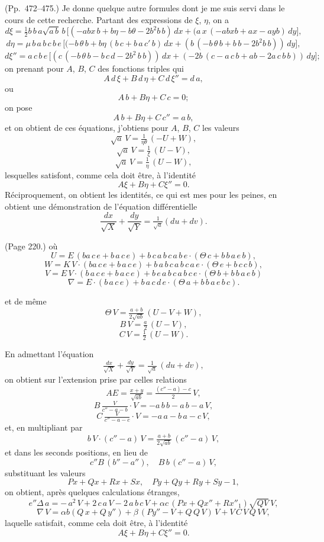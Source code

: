 \documentclass[11pt,a4paper]{article}
\theoremstyle{plain}
\theoremstyle{definition}
\begin{document}
\noindent (Pp.~472--475.) Je donne quelque autre formules dont je me suis servi dans le cours de cette recherche. Partant des expressions de $\xi$, $\eta$, on a
\[
d\xi = \tfrac{1}{2}b\,b\,a\sqrt{a\,b}\,b\,\big[(- a b x\,b + b\eta - b\theta - 2 b^2 b\,b)\,d x
+ (a\,x\,(- a b x b + ax - ay b)\,d y\big],
\]
\[
d\eta = \mu\,b\,a\,b\,c\,b\,e\,\big[(- b\,\theta\,b + b\eta\,(b\,c + b\,a\,c'\,b)\,d x
+ (b\,(- b\,\theta\,b + b\,b - 2 b^2 b\,b))\,d y\big],
\]
\[
d\xi'' = a\,c\,b\,e\,\big[(c\,(- b\,\theta\,b - b\,c\,d - 2 b^2\,b\,b))\,d x + (- 2 b\,(c - a\,c\,b + a b - 2 a\,c\,b\,b))\,d y\big];
\]
on prenant pour $A$, $B$, $C$ des fonctions triples qui
\[
A\,d\,\xi + B\,d\,\eta + C\,d\,\xi'' = d\,a,
\]
ou
\[
A\,b + B\eta + C\,c = 0;
\]
on pose
\[
A\,b + B\eta + C\,c'' = a\,b,
\]
et on obtient de ces \'equations, j'obtiens pour $A$, $B$, $C$ les valeurs
\[
\sqrt{a}\,V = \tfrac{1}{\eta\theta}\,(- U + W),
\]
\[
\sqrt{a}\,V = \tfrac{1}{\xi}\,(U - V),
\]
\[
\sqrt{a}\,V = \tfrac{1}{\eta}\,(U - W),
\]
lesquelles satisfont, comme cela doit \^etre, \`a l'identit\'e
\[
A\xi + B\eta + C\xi'' = 0.
\]
R\'eciproquement, on obtient les identit\'es, ce qui est mes pour les peines, en obtient une d\'emonstration de l'\'equation diff\'erentielle
\[
\frac{dx}{\sqrt{X}} + \frac{dy}{\sqrt{Y}} = \tfrac{1}{\sqrt{a}} (du + dv).
\]

\medskip

\noindent (Page 220.) o\`u
\[
U = E\,(ba\,c\,e + b\,a\,c\,e) + b\,c\,a\,b\,c\,a\,b\,e \cdot (\Theta\,c + b\,b\,a\,e\,b),
\]
\[
W = K\,V \cdot (ba\,c\,e + b\,a\,c\,e) + b\,a\,b\,c\,a\,b\,c\,a\,e \cdot (\Theta\,e + b\,c\,c\,b),
\]
\[
V = E\,V \cdot (b\,a\,c\,e + b\,a\,c\,e) + b\,e\,a\,b\,c\,a\,b\,c\,e \cdot (\Theta\,b + b\,b\,a\,e\,b)
\]
\[
\nabla = E \cdot (b\,a\,c\,e) + b\,a\,c\,d\,e \cdot (\Theta\,a + b\,b\,a\,e\,b\,c).
\]

et de m\^eme
\[
\Theta\,V = \tfrac{a + b}{2\sqrt{a b}}\,(U - V + W),
\]
\[
B\,V = \tfrac{a}{2}\,(U - V),
\]
\[
C\,V = \tfrac{1}{2}\,(U - W).
\]

En admettant l'\'equation
\[
\tfrac{dx}{\sqrt{X}} + \tfrac{dy}{\sqrt{Y}} = \tfrac{1}{\sqrt{a}}\,(du + dv),
\]
on obtient sur l'extension prise par celles relations
\[
A E = \tfrac{x + y}{\sqrt{a b}} = \tfrac{(c'' - a) - c}{2}\,V,
\]
\[
B\,\tfrac{V}{c'' - a - b} \cdot V = - a\,b\,b - a\,b - a\,V,
\]
\[
C\,\tfrac{V}{c'' - a - c} \cdot V = - a\,a - b\,a - c\,V,
\]
et, en multipliant par
\[
b\,V \cdot (c'' - a)\,V = \tfrac{a + b}{2\sqrt{a b}}\,(c'' - a)\,V,
\]
et dans les seconds positions, en lieu de
\[
c''B\,(b'' - a''),\quad B\,b\,(c'' - a)\,V,
\]
substituant les valeurs
\[
P x + Q x + R x + S x,\quad P y + Q y + R y + S y - 1,
\]
on obtient, apr\`es quelques calculations \'etranges,
\[
e''\Delta\,a = -\,a^2\,V + 2\,c\,a\,V - 2\,a\,b\,c\,V + \alpha c\,(P x + Q x'' + R x''_1)\sqrt{Q V}\,V,
\]
\[
\nabla\,V = \alpha b(Q\,x + Q\,y'') + \beta\,(P y'' - V + Q\,Q\,V)\,V + V\,C\,V\,Q\,V V,
\]
laquelle satisfait, comme cela doit \^etre, \`a l'identit\'e
\[
A\xi + B\eta + C\xi'' = 0.
\]
\end{document}
